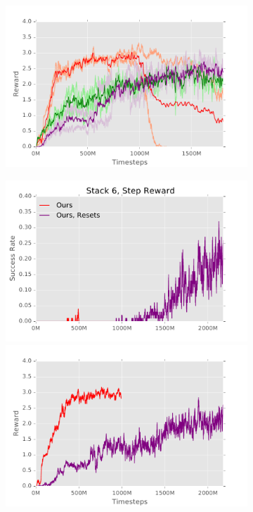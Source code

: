 \begin{figure}[t]
\begin{subfigure}{0.3\linewidth}
        \includegraphics[width=1.0\linewidth]{bcddpg/figs/5_reward}
    \end{subfigure}
    \begin{subfigure}{0.3\linewidth}
        \includegraphics[width=1.0\linewidth]{bcddpg/figs/6_success}
        \includegraphics[width=1.0\linewidth]{bcddpg/figs/6_reward}
    \end{subfigure}
    

\end{figure}
